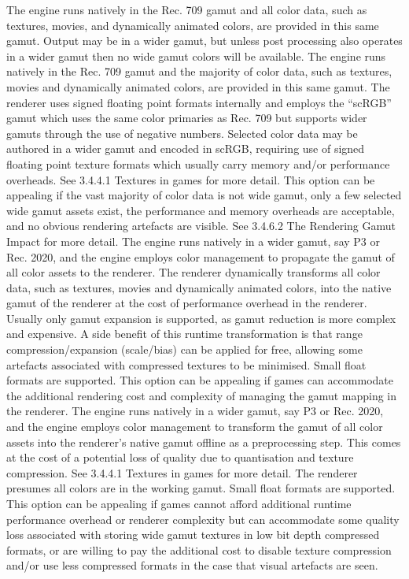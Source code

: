The engine runs natively in the Rec. 709 gamut and all color data, such as textures, movies, and dynamically animated colors, are provided in this same gamut. Output may be in a wider gamut, but unless post processing also operates in a wider gamut then no wide gamut colors will be available.
The engine runs natively in the Rec. 709 gamut and the majority of color data, such as textures, movies and dynamically animated colors, are provided in this same gamut. The renderer uses signed floating point formats internally and employs the “scRGB” gamut which uses the same color primaries as Rec. 709 but supports wider gamuts through the use of negative numbers. Selected color data may be authored in a wider gamut and encoded in scRGB, requiring use of signed floating point texture formats which usually carry memory and/or performance overheads. See 3.4.4.1 Textures in games for more detail. This option can be appealing if the vast majority of color data is not wide gamut, only a few selected wide gamut assets exist, the performance and memory overheads are acceptable, and no obvious rendering artefacts are visible. See 3.4.6.2 The Rendering Gamut Impact for more detail.
The engine runs natively in a wider gamut, say P3 or Rec. 2020, and the engine employs color management to propagate the gamut of all color assets to the renderer. The renderer dynamically transforms all color data, such as textures, movies and dynamically animated colors, into the native gamut of the renderer at the cost of performance overhead in the renderer. Usually only gamut expansion is supported, as gamut reduction is more complex and expensive. A side benefit of this runtime transformation is that range compression/expansion (scale/bias) can be applied for free, allowing some artefacts associated with compressed textures to be minimised. Small float formats are supported. This option can be appealing if games can accommodate the additional rendering cost and complexity of managing the gamut mapping in the renderer.
The engine runs natively in a wider gamut, say P3 or Rec. 2020, and the engine employs color management to transform the gamut of all color assets into the renderer’s native gamut offline as a preprocessing step. This comes at the cost of a potential loss of quality due to quantisation and texture compression. See 3.4.4.1 Textures in games for more detail. The renderer presumes all colors are in the working gamut. Small float formats are supported. This option can be appealing if games cannot afford additional runtime performance overhead or renderer complexity but can accommodate some quality loss associated with storing wide gamut textures in low bit depth compressed formats, or are willing to pay the additional cost to disable texture compression and/or use less compressed formats in the case that visual artefacts are seen.

